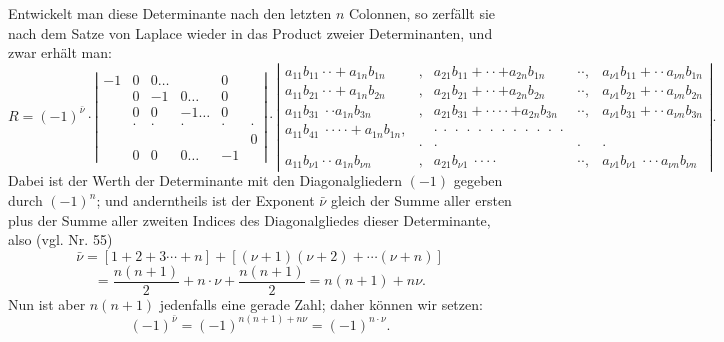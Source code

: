 \documentclass[11pt]{article}
\providecommand{\weberpage}[1]{}
\begin{document}
Entwickelt man diese Determinante nach den letzten $n$ Colonnen, so
zerf\"allt sie nach dem Satze von Laplace wieder in das Product zweier
Determinanten, und zwar erh\"alt man:
{\scriptsize\setlength{\arraycolsep}{3pt}
\[
R=(-1)^{\bar\nu}\cdot
\left|\begin{array}{cccccc}
-1 & 0 & 0\ldots & & 0\\
& 0 & -1 & 0\ldots & 0\\
& 0 & 0 & -1\ldots & 0\\
& \cdot & \cdot & \cdot & \cdot & \cdot\\
& & & & & 0\\
& 0 & 0 & 0\ldots & -1
\end{array}\right|
\cdot
\left|\begin{array}{ccccc}
a_{11}b_{11}\cdot\cdot+a_{1n}b_{1n} & , & a_{21}b_{11}+\cdot\cdot+a_{2n}b_{1n} & \cdot\cdot, & a_{\nu 1}b_{11}+\cdot\cdot a_{\nu n}b_{1n}\\
a_{11}b_{21}\cdot\cdot+a_{1n}b_{2n} & , & a_{21}b_{21}+\cdot\cdot+a_{2n}b_{2n} & \cdot\cdot, & a_{\nu 1}b_{21}+\cdot\cdot a_{\nu n}b_{2n}\\
a_{11}b_{31}\ \cdot\cdot a_{1n}b_{3n} & , & a_{21}b_{31}+\cdot\cdot\cdot\cdot+a_{2n}b_{3n} & \cdot\cdot, & a_{\nu 1}b_{31}+\cdot\cdot a_{\nu n}b_{3n}\\
a_{11}b_{41}\ \cdot\cdot\cdot\cdot+a_{1n}b_{1n}, & & \cdot\ \cdot\ \cdot\ \cdot\ \cdot\ \cdot\ \cdot\ \cdot\ \cdot\ \cdot\ \cdot\ \cdot & &\\
& \cdot & \cdot & \cdot & \cdot\\
a_{11}b_{\nu 1}\cdot\cdot\ a_{1n}b_{\nu n} & , & a_{21}b_{\nu 1}\ \cdot\cdot\cdot\cdot & \cdot\cdot, & a_{\nu 1}b_{\nu 1}\ \cdot\cdot\cdot a_{\nu n}b_{\nu n}
\end{array}\right|.
\]
}
Dabei ist der Werth der Determinante mit den Diagonalgliedern $(-1)$
gegeben durch $(-1)^n$; und anderntheils ist der Exponent $\bar\nu$ gleich der
Summe aller ersten plus der Summe aller zweiten Indices des Diagonalgliedes
dieser Determinante, also (vgl. Nr. 55)
\[
\bar\nu=[1+2+3\cdots+n]+[(\nu+1)(\nu+2)+\cdots(\nu+n)]
\]
\[
=\frac{n(n+1)}{2}+n\cdot\nu+\frac{n(n+1)}{2}=n(n+1)+n\nu.
\]
Nun ist aber $n(n+1)$ jedenfalls eine gerade Zahl; daher k\"onnen wir setzen:
\[
(-1)^{\bar\nu}=(-1)^{n(n+1)+n\nu}=(-1)^{n\cdot\nu}.
\]


\weberpage{82}
\end{document}
